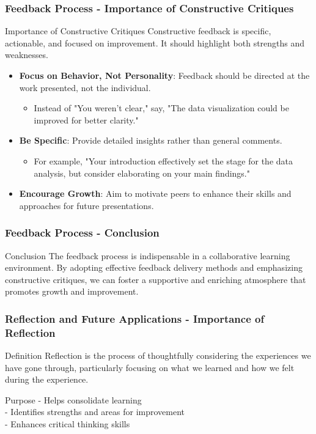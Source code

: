 \documentclass[aspectratio=169]{beamer}
\begin{document}
\begin{frame}[fragile]
    \frametitle{Feedback Process - Importance of Constructive Critiques}
    \begin{block}{Importance of Constructive Critiques}
        Constructive feedback is specific, actionable, and focused on improvement. It should highlight both strengths and weaknesses.
        \begin{itemize}
            \item \textbf{Focus on Behavior, Not Personality}: Feedback should be directed at the work presented, not the individual.
                \begin{itemize}
                    \item Instead of "You weren’t clear," say, "The data visualization could be improved for better clarity."
                \end{itemize}
            \item \textbf{Be Specific}: Provide detailed insights rather than general comments. 
                \begin{itemize}
                    \item For example, "Your introduction effectively set the stage for the data analysis, but consider elaborating on your main findings."
                \end{itemize}
            \item \textbf{Encourage Growth}: Aim to motivate peers to enhance their skills and approaches for future presentations.
        \end{itemize}
    \end{block}
\end{frame}

\begin{frame}[fragile]
    \frametitle{Feedback Process - Conclusion}
    \begin{block}{Conclusion}
        The feedback process is indispensable in a collaborative learning environment. 
        By adopting effective feedback delivery methods and emphasizing constructive critiques, we can foster a supportive and enriching atmosphere that promotes growth and improvement.
    \end{block}
\end{frame}

\begin{frame}[fragile]
    \frametitle{Reflection and Future Applications - Importance of Reflection}
    \begin{block}{Definition}
        Reflection is the process of thoughtfully considering the experiences we have gone through, particularly focusing on what we learned and how we felt during the experience.
    \end{block}
    \begin{block}{Purpose}
        - Helps consolidate learning\\
        - Identifies strengths and areas for improvement\\
        - Enhances critical thinking skills
    \end{block}
\end{frame}
\end{document}
